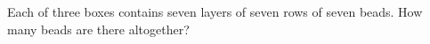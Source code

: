 Each of three boxes contains seven layers of seven rows of seven beads. How many beads are there altogether?
